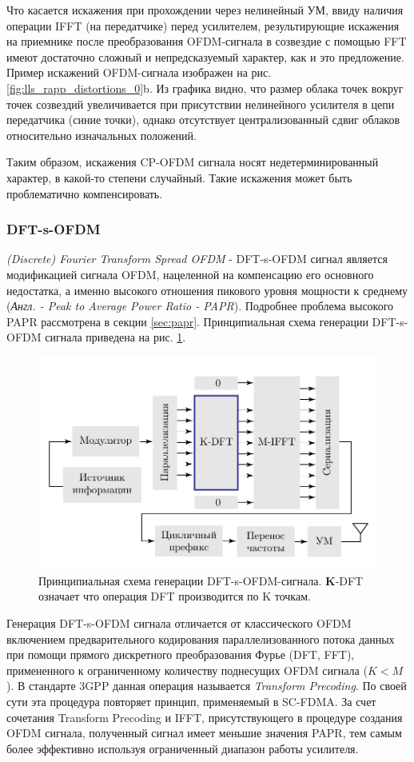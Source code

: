 Что касается искажения при прохождении через нелинейный УМ, ввиду наличия
операции IFFT (на передатчике) перед усилителем, результирующие искажения
на приемнике после преобразования OFDM-сигнала в созвездие с помощью FFT
имеют достаточно сложный и непредсказуемый характер, как и это предложение.
Пример искажений OFDM-сигнала изображен на рис.
\ref{fig:lls_rapp_distortions_0}b. Из графика видно, что размер облака
точек вокруг точек созвездий увеличивается при присутствии нелинейного
усилителя в цепи передатчика (синие точки), однако отсутствует
централизованный сдвиг облаков относительно изначальных положений. 

Таким образом, искажения CP-OFDM сигнала носят недетерминированный
характер, в какой-то степени случайный. Такие искажения может быть
проблематично компенсировать.

\subsubsection{DFT-s-OFDM}
\textit{(Discrete) Fourier Transform Spread OFDM} - DFT-s-OFDM сигнал
является модификацией сигнала OFDM, нацеленной на компенсацию его основного
недостатка, а именно высокого отношения пикового уровня мощности к среднему
(\textit{Англ. - Peak to Average Power Ratio - PAPR}). Подробнее проблема
высокого PAPR рассмотрена в секции \ref{sec:papr}. Принципиальная схема
генерации DFT-s-OFDM сигнала приведена на рис. \ref{fig:dfts_scheme}.
\begin{figure}[h!]
    \centering
    \includegraphics[scale=1]{figs/dfts_scheme.pdf}
    \caption{Принципиальная схема генерации DFT-s-OFDM-сигнала.
    \textbf{K}-DFT означает что операция DFT производится по K точкам.}
    \label{fig:dfts_scheme}
\end{figure}
Генерация DFT-s-OFDM сигнала отличается от классического OFDM включением
предварительного кодирования параллелизованного потока данных при помощи
прямого дискретного преобразования Фурье (DFT, FFT), примененного к
ограниченному количеству поднесущих OFDM сигнала ($K<M$). В стандарте 3GPP
данная операция называется \textit{Transform Precoding}. По своей сути
эта процедура повторяет принцип, применяемый в SC-FDMA. За счет
сочетания Transform Precoding и IFFT, присутствующего в процедуре создания
OFDM сигнала, полученный сигнал имеет меньшие значения PAPR, тем самым
более эффективно используя ограниченный диапазон работы усилителя.

